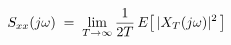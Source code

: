 \documentclass[preview]{standalone}
\begin{document}
\begin{align*}
\special{dvisvgm:raw <g id='unique000'>}S_{xx}(j\omega)\;=\;\lim_{T\to\infty}\frac{1}{2T}\,E\big[\,|X_T(j\omega)|^2\,\big]\special{dvisvgm:raw </g>}
\end{align*}
\end{document}
